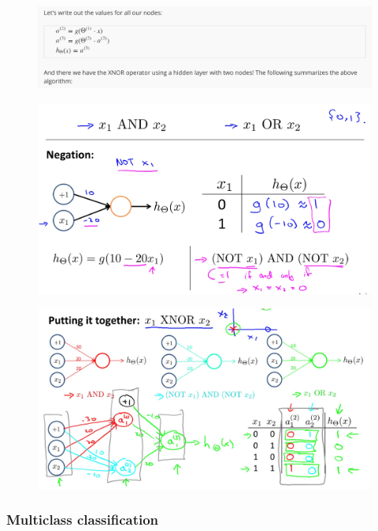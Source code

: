 \documentclass[12pt, A4,onecolumn]{article} %
\begin{document}
\begin{figure}[H]
	\centering
	\includegraphics[width=1\textwidth]{./ImagenesW4/examplesII2}
\end{figure}

\begin{figure}[H]
	\centering
	\includegraphics[width=1\textwidth]{./ImagenesW4/andor}
\end{figure}

\begin{figure}[H]
	\centering
	\includegraphics[width=1\textwidth]{./ImagenesW4/xnor}
\end{figure}

\subsubsection{Multiclass classification}
\end{document}
